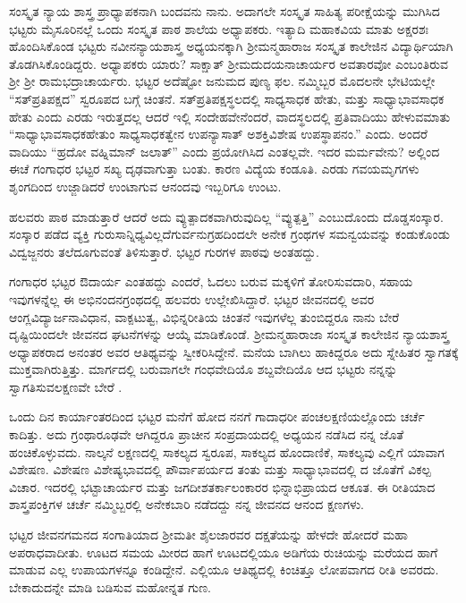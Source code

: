 {ಸಂಸ್ಕೃತ ನ್ಯಾಯ ಶಾಸ್ತ್ರ ಪ್ರಾಧ್ಯಾಪಕನಾಗಿ ಬಂದವನು ನಾನು. ಅದಾಗಲೇ ಸಂಸ್ಕೃತ ಸಾಹಿತ್ಯ ಪರೀಕ್ಷೆಯನ್ನು ಮುಗಿಸಿದ ಭಟ್ಟರು ಮೈಸೂರಿನಲ್ಲೆ ಒಂದು ಸಂಸ್ಕೃತ ಪಾಠ ಶಾಲೆಯ ಅಧ್ಯಾಪಕರು.  ಇತ್ಯಾದಿ ಮಹಾಕವಿಯ ಮಾತು ಅಕ್ಷರಶಃ ಹೊಂದಿಸಿಕೊಂಡ ಭಟ್ಟರು ನವೀನನ್ಯಾಯಶಾಸ್ತ್ರ ಅಧ್ಯಯನಕ್ಕಾಗಿ ಶ್ರೀಮನ್ಮಹಾ\-ರಾಜ ಸಂಸ್ಕೃತ ಕಾಲೇಜಿನ ವಿದ್ಯಾರ್ಥಿಯಾಗಿ ತೊಡಗಿಸಿಕೊಂಡಿದ್ದರು. ಅಧ್ಯಾಪಕರು ಯಾರು? ಸಾಕ್ಷಾತ್ ಶ್ರೀಮದುದಯನಾಚಾರ್ಯರ ಅವತಾರವೋ ಎಂಬಂತಿರುವ ಶ್ರೀ ಶ್ರೀ ರಾಮಭದ್ರಾಚಾರ್ಯರು. ಭಟ್ಟರ ಅದೆಷ್ಟೋ ಜನುಮದ ಪುಣ್ಯ ಫಲ. ನಮ್ಮಿಬ್ಬರ ಮೊದಲನೇ ಭೇಟಿಯಲ್ಲೇ “ಸತ್‍ಪ್ರತಿಪಕ್ಷದ” ಸ್ವರೂಪದ ಬಗ್ಗೆ ಚಿಂತನೆ. ಸತ್‍ಪ್ರತಿಪಕ್ಷಸ್ಥಲದಲ್ಲಿ ಸಾಧ್ಯಸಾಧಕ ಹೇತು, ಮತ್ತು ಸಾಧ್ಯಾಭಾವಸಾಧಕ ಹೇತು ಎಂದು ಎರಡು ಇರುತ್ತದಲ್ಲ ಆದರೆ ಇಲ್ಲಿ ಸಂದೇಹವೇನೆಂದರೆ, ವಾದಸ್ಥಲದಲ್ಲಿ ಪ್ರತಿವಾದಿಯು ಹೇಳುವಮಾತು “ಸಾಧ್ಯಾಭಾವಸಾಧಕಹೇತುಂ ಸಾಧ್ಯಸಾಧಕತ್ವೇನ ಉಪನ್ಯಾಸಾತ್ ಅಶಕ್ತಿವಿಶೇಷ ಉಪಸ್ಥಾಪನಂ.” ಎಂದು. ಅಂದರೆ ವಾದಿಯು “ಹ್ರದೋ ವಹ್ನಿಮಾನ್ ಜಲಾತ್” ಎಂದು ಪ್ರಯೋಗಿಸಿದ ಎಂತಲ್ಲವೇ. ಇದರ ಮರ್ಮವೇನು? ಅಲ್ಲಿಂದ ಈಚೆ ಗಂಗಾಧರ ಭಟ್ಟರ ಸಖ್ಯ ದೃಢವಾಗುತ್ತಾ ಬಂತು. ಕಾರಣ ವಿದ್ಯೆಯ ಕಂಡೂತಿ. ಎರಡು ಗವಯಮೃಗಗಳು ಶೃಂಗದಿಂದ  ಉಜ್ಜಾಡಿದರೆ ಉಂಟಾಗುವ ಆನಂದವು ಇಬ್ಬರಿಗೂ ಉಂಟು.

ಹಲವರು ಪಾಠ ಮಾಡುತ್ತಾರೆ ಆದರೆ ಅದು ವ್ಯುತ್ಪಾದಕವಾಗಿರುವುದಿಲ್ಲ “ವ್ಯುತ್ಪತ್ತಿ” ಎಂಬುದೊಂದು ದೊಡ್ಡಸಂಸ್ಕಾರ. ಸಂಸ್ಕಾರ ಪಡೆದ ವ್ಯಕ್ತಿ ಗುರುಸಾನ್ನಿಧ್ಯವಿಲ್ಲದೆ\break ಗುರ್ವನುಗ್ರಹದಿಂದಲೇ ಅನೇಕ ಗ್ರಂಥಗಳ ಸಮನ್ವಯವನ್ನು ಕಂಡುಕೊಂಡು ವಿದ್ವಜ್ಜನರು ತಲೆದೂಗುವಂತೆ ತಿಳಿಸುತ್ತಾರೆ. ಭಟ್ಟರ ಗುರಗಳ ಪಾಠವು ಅಂತಹದ್ದು.

ಗಂಗಾಧರ ಭಟ್ಟರ  ಔದಾರ್ಯ ಎಂತಹದ್ದು ಎಂದರೆ, ಓದಲು ಬರುವ ಮಕ್ಕಳಿಗೆ ತೋರಿಸುವದಾರಿ, ಸಹಾಯ ಇವುಗಳನ್ನೆಲ್ಲ ಈ ಅಭಿನಂದನಗ್ರಂಥದಲ್ಲಿ ಹಲವರು ಉಲ್ಲೇಖಿಸಿದ್ದಾರೆ. ಭಟ್ಟರ ಜೀವನದಲ್ಲಿ ಅವರ ಆಂಗ್ಲವಿದ್ಯಾರ್ಜನಾವಿಧಾನ, ವಾಕ್ಪಟುತ್ವ, ವಿಭಿನ್ನರೀತಿಯ ಚಿಂತನೆ ಇವುಗಳೆಲ್ಲ ತುಂಬಿದ್ದರೂ ನಾನು ಬೇರೆ ದೃಷ್ಟಿಯಿಂದಲೇ ಜೀವನದ ಘಟನೆಗಳನ್ನು ಆಯ್ಕೆ ಮಾಡಿಕೊಂಡೆ. ಶ್ರೀಮನ್ಮಹಾರಾಜಾ ಸಂಸ್ಕೃತ ಕಾಲೇಜಿನ ನ್ಯಾಯಶಾಸ್ತ್ರ ಅಧ್ಯಾಪಕರಾದ ಅನಂತರ ಅವರ ಆತಿಥ್ಯವನ್ನು ಸ್ವೀಕರಿಸಿದ್ದೇನೆ. ಮನೆಯ ಬಾಗಿಲು ಹಾಕಿದ್ದರೂ ಅದು ಸ್ನೇಹಿತರ ಸ್ವಾಗತಕ್ಕೆ ಮುಕ್ತವಾಗಿರುತ್ತಿತ್ತು. ಮಾರ್ಗದಲ್ಲಿ ಬರುವಾಗಲೇ ಗಂಧವೇದಿಯೊ ಶಬ್ದವೇದಿಯೊ ಆದ ಭಟ್ಟರು ನನ್ನನ್ನು ಸ್ವಾಗತಿಸುವ\break ಲಕ್ಷಣವೇ ಬೇರೆ .

ಒಂದು ದಿನ ಕಾರ್ಯಾಂತರದಿಂದ ಭಟ್ಟರ ಮನೆಗೆ ಹೋದ ನನಗೆ ಗಾದಾಧರೀ ಪಂಚಲಕ್ಷಣಿಯಲ್ಲೊಂದು ಚರ್ಚೆ ಕಾದಿತ್ತು. ಅದು ಗ್ರಂಥಾರೂಢವೇ ಆಗಿದ್ದರೂ ಪ್ರಾಚೀನ ಸಂಪ್ರದಾಯದಲ್ಲಿ ಅಧ್ಯಯನ ನಡೆಸಿದ ನನ್ನ ಜೊತೆ ಹಂಚಿಕೊಳ್ಳುವದು. ನಾಲ್ಕನೆ ಲಕ್ಷಣದಲ್ಲಿ ಸಾಕಲ್ಯದ ಸ್ವರೂಪ, ಸಾಕಲ್ಯದ ಹೊಂದಾಣಿಕೆ, ಸಾಕಲ್ಯವು ಎಲ್ಲಿಗೆ ಯಾವಾಗ ವಿಶೇಷಣ. ವಿಶೇಷಣ ವಿಶೇಷ್ಯಭಾವದಲ್ಲಿ ಪೌರ್ವಾಪರ್ಯದ ತಂತು ಮತ್ತು ಸಾಧ್ಯಾಭಾವದಲ್ಲಿ   \enginline{-}    \enginline{-}   ದ ಜೊತೆಗೆ ವಿಕಲ್ಪ ವಿಚಾರ. ಇದರಲ್ಲಿ ಭಟ್ಟಾಚಾರ್ಯರ ಮತ್ತು ಜಗದೀಶತರ್ಕಾಲಂಕಾರರ ಭಿನ್ನಾಭಿಪ್ರಾಯದ ಆಕೂತ. ಈ ರೀತಿಯಾದ ಶಾಸ್ತ್ರಪಂಕ್ತಿಗಳ ಚರ್ಚೆ ನಮ್ಮಿಬ್ಬರಲ್ಲಿ ಅನೇಕಬಾರಿ ನಡೆದದ್ದು ನನ್ನ ಜೀವನದ ಆನಂದ ಕ್ಷಣಗಳು.

ಭಟ್ಟರ ಜೀವನಗಮನದ ಸಂಗಾತಿಯಾದ ಶ್ರೀಮತೀ ಶೈಲಜಾರವರ ದಕ್ಷತೆಯನ್ನು ಹೇಳದೇ ಹೋದರೆ ಮಹಾ ಅಪರಾಧವಾದೀತು. ಊಟದ ಸಮಯ ಮೀರದ ಹಾಗೆ ಊಟದಲ್ಲಿಯೂ ಅಡಿಗೆಯ ರುಚಿಯನ್ನು ಮರೆಯದ ಹಾಗೆ ಮಾಡುವ ಎಲ್ಲ ಉಪಾಯ\-ಗಳನ್ನೂ ಕಂಡಿದ್ದೇನೆ. ಎಲ್ಲಿಯೂ ಆತಿಥ್ಯದಲ್ಲಿ ಕಿಂಚಿತ್ತೂ ಲೋಪವಾಗದ ರೀತಿ ಅವರದು. ಬೇಕಾದುದನ್ನೇ ಮಾಡಿ ಬಡಿಸುವ ಮಹೋನ್ನತ ಗುಣ.

}
